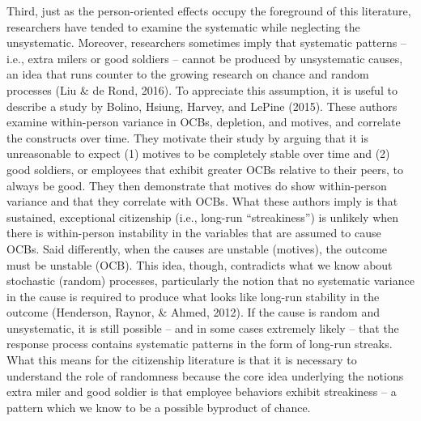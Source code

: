 \documentclass[english,,man]{apa6}
\begin{document}
Third, just as the person-oriented effects occupy the foreground of this literature, researchers have tended to examine the systematic while neglecting the unsystematic. Moreover, researchers sometimes imply that systematic patterns -- i.e., extra milers or good soldiers -- cannot be produced by unsystematic causes, an idea that runs counter to the growing research on chance and random processes (Liu \& de Rond, 2016). To appreciate this assumption, it is useful to describe a study by Bolino, Hsiung, Harvey, and LePine (2015). These authors examine within-person variance in OCBs, depletion, and motives, and correlate the constructs over time. They motivate their study by arguing that it is unreasonable to expect (1) motives to be completely stable over time and (2) good soldiers, or employees that exhibit greater OCBs relative to their peers, to always be good. They then demonstrate that motives do show within-person variance and that they correlate with OCBs. What these authors imply is that sustained, exceptional citizenship (i.e., long-run \enquote{streakiness}) is unlikely when there is within-person instability in the variables that are assumed to cause OCBs. Said differently, when the causes are unstable (motives), the outcome must be unstable (OCB). This idea, though, contradicts what we know about stochastic (random) processes, particularly the notion that no systematic variance in the cause is required to produce what looks like long-run stability in the outcome (Henderson, Raynor, \& Ahmed, 2012). If the cause is random and unsystematic, it is still possible -- and in some cases extremely likely -- that the response process contains systematic patterns in the form of long-run streaks. What this means for the citizenship literature is that it is necessary to understand the role of randomness because the core idea underlying the notions extra miler and good soldier is that employee behaviors exhibit streakiness -- a pattern which we know to be a possible byproduct of chance.
\end{document}

